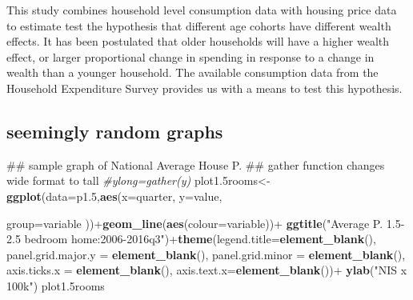 \documentclass[12pt,a4paper,]{article}
\newenvironment{Shaded}{\begin{snugshade}}{\end{snugshade}}
\newcommand{\KeywordTok}[1]{\textcolor[rgb]{0.13,0.29,0.53}{\textbf{{#1}}}}
\newcommand{\DataTypeTok}[1]{\textcolor[rgb]{0.13,0.29,0.53}{{#1}}}
\newcommand{\FloatTok}[1]{\textcolor[rgb]{0.00,0.00,0.81}{{#1}}}
\newcommand{\StringTok}[1]{\textcolor[rgb]{0.31,0.60,0.02}{{#1}}}
\newcommand{\CommentTok}[1]{\textcolor[rgb]{0.56,0.35,0.01}{\textit{{#1}}}}
\newcommand{\NormalTok}[1]{{#1}}
\begin{document}
This study combines household level consumption data with housing price
data to estimate test the hypothesis that different age cohorts have
different wealth effects. It has been postulated that older households
will have a higher wealth effect, or larger proportional change in
spending in response to a change in wealth than a younger household. The
available consumption data from the Household Expenditure Survey
provides us with a means to test this hypothesis.

\subsection{seemingly random graphs}\label{seemingly-random-graphs}

\begin{Shaded}
\begin{Highlighting}[]
\NormalTok{## sample graph of National Average House P.}
\NormalTok{## gather function changes wide format to tall}
\CommentTok{#ylong=gather(y)}
\NormalTok{plot1.5rooms<-}\KeywordTok{ggplot}\NormalTok{(}\DataTypeTok{data=}\NormalTok{p1}\FloatTok{.5}\NormalTok{,}\KeywordTok{aes}\NormalTok{(}\DataTypeTok{x=}\NormalTok{quarter,}
                     \DataTypeTok{y=}\NormalTok{value,}
                    
                     \DataTypeTok{group=}\NormalTok{variable}
                     \NormalTok{))+}\KeywordTok{geom_line}\NormalTok{(}\KeywordTok{aes}\NormalTok{(}\DataTypeTok{colour=}\NormalTok{variable))+}
\StringTok{                     }\KeywordTok{ggtitle}\NormalTok{(}\StringTok{"Average P. 1.5-2.5 bedroom home:2006-2016q3"}\NormalTok{)+}\KeywordTok{theme}\NormalTok{(}\DataTypeTok{legend.title=}\KeywordTok{element_blank}\NormalTok{(),}
                   \DataTypeTok{panel.grid.major.y =} \KeywordTok{element_blank}\NormalTok{(),}
                   \DataTypeTok{panel.grid.minor =} \KeywordTok{element_blank}\NormalTok{(),}
                   \DataTypeTok{axis.ticks.x =} \KeywordTok{element_blank}\NormalTok{(),}
                   \DataTypeTok{axis.text.x=}\KeywordTok{element_blank}\NormalTok{())+}\StringTok{ }\KeywordTok{ylab}\NormalTok{(}\StringTok{"NIS x 100k"}\NormalTok{)}
\NormalTok{plot1.5rooms}
\end{Highlighting}
\end{Shaded}
\end{document}
